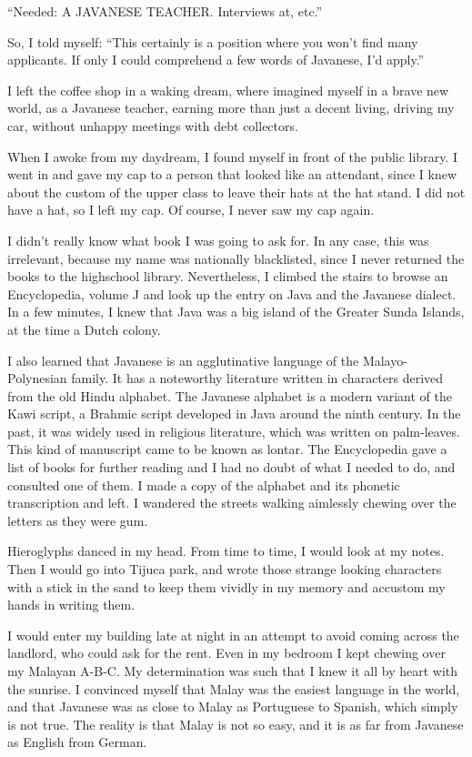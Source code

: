 \documentclass[a4paper,12pt]{book}
\begin{document}
``Needed: A JAVANESE TEACHER.  Interviews at, etc.''

So, I told myself: ``This certainly is a position
where you won't find many applicants. If only I
could comprehend a few words of Javanese,
I'd apply.''

I left the coffee shop in a waking dream,
where imagined myself in a brave new world,
as a Javanese teacher,
earning more than just a decent living,
driving my car,
without unhappy meetings with debt collectors.

When I awoke from my daydream,
I found myself in front of the public library.
I went in and gave my cap to a
person that looked like an attendant,
since I knew about the custom of the
upper class to leave their hats at
the hat stand. I did not have
a hat, so I left my cap. Of course,
I never saw my cap again.

I didn't really know what
book I was going to ask for.
In any case, this was irrelevant,
because my name was nationally blacklisted,
since I never returned the books to
the highschool library. Nevertheless,
I climbed the stairs to browse
an Encyclopedia,
volume J and look up the entry on
Java and the Javanese dialect. 
In a few minutes, I knew that Java was a
big island of the Greater Sunda Islands,
at the time a Dutch colony.

I also learned that Javanese is an agglutinative
language of the Malayo-Polynesian family.
It has a noteworthy literature written in
characters derived from the old Hindu alphabet.
The Javanese alphabet is a modern variant
of the Kawi script, a Brahmic script developed
in Java around the ninth century.
In the past, it was widely used in religious literature,
which was written on palm-leaves.
This kind of manuscript came to be known
as  lontar.
The Encyclopedia gave a list of books for further
reading and I had no doubt of what I needed
to do, and consulted one of them.
I made a copy of the alphabet and its phonetic
transcription and left. I wandered the streets
walking aimlessly chewing over the letters as
they were gum.

Hieroglyphs danced in my head. From time to time,
I would look at my notes. Then I would
go into Tijuca park, and wrote
those strange looking characters
with a stick in the sand to keep
them vividly in my memory
and accustom my hands in writing them.

I would enter my building late at night in
an attempt to avoid coming across the
landlord, who could ask for the rent.
Even in my bedroom I kept chewing over
my Malayan A-B-C. My determination was such
that I knew it all by heart with the sunrise.
I convinced myself that Malay was the
easiest language in the world, and that Javanese
was as close to Malay as Portuguese to
Spanish, which simply is not true.
The reality is that Malay is not so
easy, and it is  as
far from Javanese as English from German.
\end{document}
